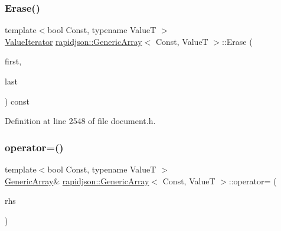 \subsubsection{\texorpdfstring{Erase()}{Erase()}\hspace{0.1cm}{\footnotesize\ttfamily [2/2]}}
{\footnotesize\ttfamily template$<$bool Const, typename ValueT $>$ \\
\mbox{\hyperlink{classrapidjson_1_1_generic_array_ae94140e6dbab05cd3918d3e75819dc0a}{Value\+Iterator}} \mbox{\hyperlink{classrapidjson_1_1_generic_array}{rapidjson\+::\+Generic\+Array}}$<$ Const, ValueT $>$\+::Erase (\begin{DoxyParamCaption}\item[{\mbox{\hyperlink{classrapidjson_1_1_generic_array_a0308428814ba3ee5094114e2ccfa2572}{Const\+Value\+Iterator}}}]{first,  }\item[{\mbox{\hyperlink{classrapidjson_1_1_generic_array_a0308428814ba3ee5094114e2ccfa2572}{Const\+Value\+Iterator}}}]{last }\end{DoxyParamCaption}) const}



Definition at line 2548 of file document.\+h.


\begin{DoxyCode}{0}

\end{DoxyCode}
\mbox{\label{classrapidjson_1_1_generic_array_ab9c9bffca8056d6b20b9f92334d35798}} 
\subsubsection{\texorpdfstring{operator=()}{operator=()}}
{\footnotesize\ttfamily template$<$bool Const, typename ValueT $>$ \\
\mbox{\hyperlink{classrapidjson_1_1_generic_array}{Generic\+Array}}\& \mbox{\hyperlink{classrapidjson_1_1_generic_array}{rapidjson\+::\+Generic\+Array}}$<$ Const, ValueT $>$\+::operator= (\begin{DoxyParamCaption}\item[{\mbox{\hyperlink{classrapidjson_1_1_generic_array_a363f892bf386776e236f5db273f2599f}{const}} \mbox{\hyperlink{classrapidjson_1_1_generic_array}{Generic\+Array}}$<$ Const, ValueT $>$ \&}]{rhs }\end{DoxyParamCaption})}



